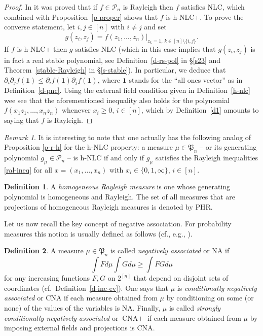 \documentclass[10pt,reqno]{amsart}
\theoremstyle{plain}
\theoremstyle{definition}
\newtheorem{definition}{Definition}[section]
\theoremstyle{remark}
\newtheorem{remark}{Remark}[section]
\newcommand{\PP}{\mathcal{P}}
\newcommand{\CNA}{\text{CNA}}
\newcommand{\NA}{\text{NA}}
\newcommand{\cN}{{[n]}}
\newcommand{\ben}{\mathbf{1}}
\newcommand{\fP}{\mathfrak{P}}
\newcommand{\pa}{\partial}
\begin{document}
\begin{proof}
In \cite[Theorem~4.4]{W} it was proved that if $f\in\PP_n$ is Rayleigh then 
$f$ satisfies NLC, which combined with Proposition~\ref{p-proper} shows that
$f$ is h-NLC+. To prove the converse statement, let $i,j\in [n]$ with $i\neq j$
and set 
$$g(z_i,z_j)=f(z_1,\ldots,z_n)|_{z_k=1,\,k\in [n]\setminus \{i,j\}}.$$
If $f$ is h-NLC+ then $g$ satisfies NLC (which in this case implies that
$g(z_i,z_j)$ is in fact a real stable polynomial, see 
Definition~\ref{d-rs-pol} in \S \ref{s23} and Theorem~\ref{stable-Rayleigh}
in \S \ref{s-stable}). In particular, we deduce that 
$\pa_i \pa_j f(\ben)\le \pa_i f(\ben)\pa_j f(\ben)$, 
where $\ben$ stands for the ``all ones vector'' as in Definition~\ref{d-pnc}.
Using the external field condition given in Definition~\ref{h-nlc}
wee see that the aforementioned inequality also holds for the polynomial
$f(x_1z_1,\ldots,x_nz_n)$ whenever $x_i\ge 0$, $i\in [n]$, which by 
Definition~\ref{d1} amounts to saying that $f$ is Rayleigh.
\end{proof}

\begin{remark}\label{r-hnlc}
It is interesting to note that one actually has the following analog of 
Proposition \ref{p-r-h}
for the h-NLC property: a measure $\mu\in\fP_n$ -- or its generating polynomial
$g_\mu\in\PP_n$ -- is h-NLC if and only if $g_\mu$ satisfies the Rayleigh 
inequalities
\eqref{ral-ineq} for all $x=(x_1,\ldots,x_n)$ with $x_i\in\{0,1,\infty\}$,
$i\in [n]$.
\end{remark}

\begin{definition}\label{phr}
A {\em homogeneous Rayleigh measure} is one whose generating polynomial
is homogeneous and Rayleigh. The set of all measures that are projections of 
homogeneous Rayleigh measures is denoted by PHR.
\end{definition}

Let us now recall the key concept of negative association. For probability 
measures this notion is usually defined as follows (cf., e.g., \cite{L2,P,W}).

\begin{definition}\label{d-na}
A measure $\mu\in\fP_n$ is called {\em negatively associated} or $\NA$ 
if
$$\int F d\mu \int G d\mu\ge \int FG d\mu$$
for any increasing functions $F,G$ on $2^\cN$ that depend on 
disjoint sets of coordinates (cf.~Definition~\ref{d-inc-ev}). One says that 
$\mu$ is {\em conditionally negatively associated}
or $\CNA$ if each measure obtained from $\mu$ by conditioning on some (or none)
of the values of the variables is $\NA$. Finally, $\mu$ is called {\em strongly
conditionally negatively associated} or $\CNA+$ if each measure obtained from 
$\mu$ by imposing external fields and projections is $\CNA$.
\end{definition}
\end{document}
